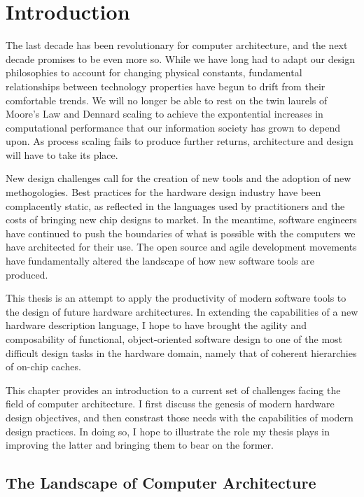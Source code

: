 \chapter{Introduction}
\label{c.intro}

The last decade has been revolutionary for computer architecture, and the next decade promises to be even more so.
While we have long had to adapt our design philosophies to account for changing physical constants,
fundamental relationships between technology properties have begun to drift from their comfortable trends.
We will no longer be able to rest on the twin laurels of Moore's Law and Dennard scaling to achieve the
expontential increases in computational performance that our information society has grown to depend upon.
As process scaling fails to produce further returns, architecture and design will have to take its place.

New design challenges call for the creation of new tools and the adoption of new methogologies.
Best practices for the hardware design industry have been complacently static,
as reflected in the languages used by practitioners and the costs of
bringing new chip designs to market.
In the meantime, software engineers have continued to push the boundaries of what is possible with the computers we have architected for their use.
The open source and agile development movements have fundamentally altered the landscape of how new software tools are produced.

This thesis is an attempt to apply the productivity of modern software tools to the design of future hardware architectures.
In extending the capabilities of a new hardware description language, I hope to have brought the agility and composability of functional, object-oriented software design to one of the most difficult design tasks in the hardware domain,
namely that of coherent hierarchies of on-chip caches.

This chapter provides an introduction to a current set of challenges facing the field of computer architecture.
I first discuss the genesis of modern hardware design objectives,
and then constrast those needs with the capabilities of modern design practices.
In doing so, I hope to illustrate the role my thesis plays in improving the latter and bringing them to bear on the former. 

\section{The Landscape of Computer Architecture}

